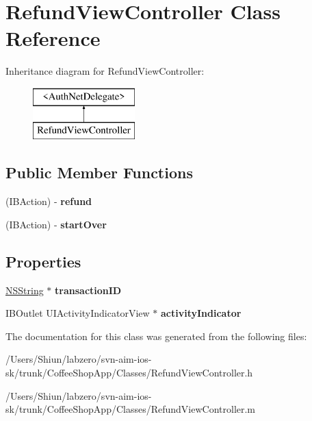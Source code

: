 \hypertarget{interface_refund_view_controller}{
\section{RefundViewController Class Reference}
\label{interface_refund_view_controller}
}
Inheritance diagram for RefundViewController:\begin{figure}[H]
\begin{center}
\leavevmode
\includegraphics[height=2.000000cm]{interface_refund_view_controller}
\end{center}
\end{figure}
\subsection*{Public Member Functions}
\begin{DoxyCompactItemize}
\item 
\hypertarget{interface_refund_view_controller_a05415161759e620c3910651f7baea756}{
(IBAction) -\/ {\bfseries refund}}
\label{interface_refund_view_controller_a05415161759e620c3910651f7baea756}

\item 
\hypertarget{interface_refund_view_controller_a5c69845ceb7f948c3c336b09978ad4c5}{
(IBAction) -\/ {\bfseries startOver}}
\label{interface_refund_view_controller_a5c69845ceb7f948c3c336b09978ad4c5}

\end{DoxyCompactItemize}
\subsection*{Properties}
\begin{DoxyCompactItemize}
\item 
\hypertarget{interface_refund_view_controller_abeb17ebfc5af6fb8432fc5de16b676f4}{
\hyperlink{class_n_s_string}{NSString} $\ast$ {\bfseries transactionID}}
\label{interface_refund_view_controller_abeb17ebfc5af6fb8432fc5de16b676f4}

\item 
\hypertarget{interface_refund_view_controller_a08e7330993a61acf5c9ffb325bcca412}{
IBOutlet UIActivityIndicatorView $\ast$ {\bfseries activityIndicator}}
\label{interface_refund_view_controller_a08e7330993a61acf5c9ffb325bcca412}

\end{DoxyCompactItemize}


The documentation for this class was generated from the following files:\begin{DoxyCompactItemize}
\item 
/Users/Shiun/labzero/svn-\/aim-\/ios-\/sk/trunk/CoffeeShopApp/Classes/RefundViewController.h\item 
/Users/Shiun/labzero/svn-\/aim-\/ios-\/sk/trunk/CoffeeShopApp/Classes/RefundViewController.m\end{DoxyCompactItemize}
